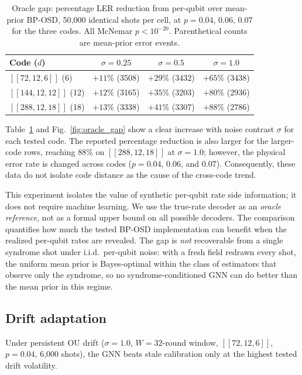 \documentclass[a4paper,twocolumn,11pt,nopdfoutputerror]{quantumarticle}
\newcommand{\code}[3]{\ensuremath{[\![#1,#2,#3]\!]}}
\begin{document}
\begin{table}[t]
\centering
\caption{Oracle gap: percentage LER reduction from per-qubit
         over mean-prior BP-OSD, 50{,}000 identical shots per cell, at
         $p=0.04$, $0.06$, $0.07$ for the three codes. All McNemar
         $p<10^{-20}$. Parenthetical counts are mean-prior error events.}
\label{tab:oracle}
\begin{tabular}{@{}lccc@{}}
\toprule
Code ($d$) & $\sigma=0.25$ & $\sigma=0.5$ & $\sigma=1.0$ \\
\midrule
$\code{72}{12}{6}$   (6)  & $+11\%$ (3508) & $+29\%$ (3432) & $+65\%$ (3438) \\
$\code{144}{12}{12}$ (12) & $+12\%$ (3165) & $+35\%$ (3203) & $+80\%$ (2936) \\
$\code{288}{12}{18}$ (18) & $+13\%$ (3338) & $+41\%$ (3307) & $+88\%$ (2786) \\
\bottomrule
\end{tabular}
\end{table}

Table~\ref{tab:oracle} and Fig.~\ref{fig:oracle_gap} show a clear
increase with noise contrast $\sigma$ for each tested code. The reported
percentage reduction is also larger for the larger-code rows, reaching
$88\%$ on $\code{288}{12}{18}$ at $\sigma=1.0$; however, the physical
error rate is changed across codes ($p=0.04$, $0.06$, and $0.07$).
Consequently, these data do not isolate code distance as the cause of
the cross-code trend.

This experiment isolates the value of synthetic per-qubit rate side
information; it does not require machine learning. We use the true-rate
decoder as an \emph{oracle reference}, not as a formal upper bound on all
possible decoders. The comparison quantifies how much the tested BP-OSD
implementation can benefit when the realized per-qubit rates are
revealed. The gap is \emph{not}
recoverable from a single syndrome shot under i.i.d.\ per-qubit
noise: with a fresh field redrawn every shot, the uniform mean
prior is Bayes-optimal within the class of estimators that observe
only the syndrome, so no syndrome-conditioned GNN can do better
than the mean prior in this regime.

\subsection{Drift adaptation}\label{sec:drift}

Under persistent OU drift ($\sigma=1.0$, $W=32$-round window,
$\code{72}{12}{6}$, $p=0.04$, 6{,}000 shots), the GNN beats
stale calibration only at the highest tested drift volatility.
\end{document}
